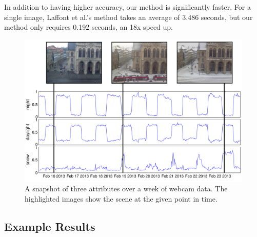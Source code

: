\documentclass[10pt,twocolumn,letterpaper]{article}
\newcommand{\tblref}[1]{Table~\ref{tbl:#1}}
\begin{document}

In addition to having higher accuracy, our method is significantly faster.  For
a single image, Laffont et al.'s method takes an average of 3.486 seconds, but
our method only requires 0.192 seconds, an 18x speed up. 

\begin{figure}[t]
	\centering
		\includegraphics[width=\linewidth, trim= 5mm 15mm 0mm 10mm]{figs/attr_compare.pdf}
		\caption{A snapshot of three attributes over a week of webcam data.
             The highlighted images show the scene at the given point in time.}
		\label{fig:attrcmp}
\end{figure}

\subsection{Example Results}
\end{document}
